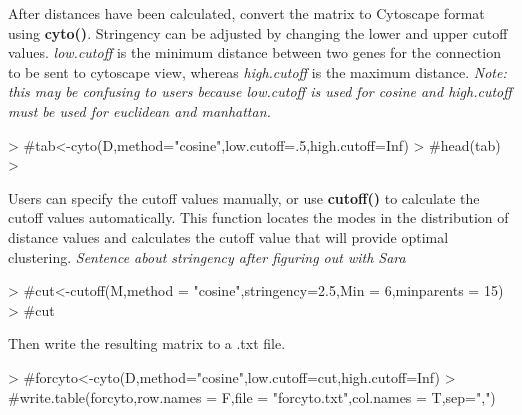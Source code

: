 \documentclass{article}
\begin{document}
After distances have been calculated, convert the matrix to Cytoscape format using \textbf{cyto()}. Stringency can be adjusted by changing the lower and upper cutoff values. \textit{low.cutoff} is the minimum distance between two genes for the connection to be sent to cytoscape view, whereas \textit{high.cutoff} is the maximum distance.  \textit{Note: this may be confusing to users because low.cutoff is used for cosine and high.cutoff must be used for euclidean and manhattan.}

\begin{Schunk}
\begin{Sinput}
> #tab<-cyto(D,method="cosine",low.cutoff=.5,high.cutoff=Inf)
> #head(tab)
> 
\end{Sinput}
\end{Schunk}



Users can specify the cutoff values manually, or use \textbf{cutoff()} to calculate the cutoff values automatically.  This function locates the modes in the distribution of distance values and calculates the cutoff value that will provide optimal clustering. \textit{Sentence about stringency after figuring out with Sara}
\vspace{2mm}
\begin{Schunk}
\begin{Sinput}
> #cut<-cutoff(M,method = "cosine",stringency=2.5,Min = 6,minparents = 15)
> #cut
\end{Sinput}
\end{Schunk}


Then write the resulting matrix to a .txt file.
\begin{Schunk}
\begin{Sinput}
> #forcyto<-cyto(D,method="cosine",low.cutoff=cut,high.cutoff=Inf)
> #write.table(forcyto,row.names = F,file = "forcyto.txt",col.names = T,sep=",")
\end{Sinput}
\end{Schunk}

% 
\end{document}

